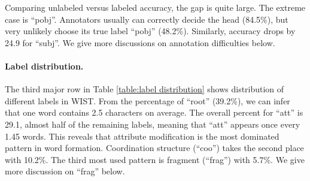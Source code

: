 Comparing unlabeled versus labeled accuracy, the gap is quite large. The extreme case is ``pobj''. Annotators usually can correctly decide the head (84.5\%), but very unlikely choose its true label ``pobj'' (48.2\%). Similarly, accuracy drops by 24.9 for ``subj''. We give more discussions on  annotation difficulties below. 






\paragraph{Label distribution.} 
The third major row in Table \ref{table:label distribution} shows distribution of different labels in WIST. 
From the percentage of ``root'' (39.2\%), we can infer that one word contains 2.5 characters on average. 
The overall percent for ``att'' is 29.1, almost half of the remaining labels, meaning that ``att'' appears once every 1.45  words. This reveals that attribute modification is the most dominated pattern in word formation. 
Coordination structure (``coo'') takes the second place with 10.2\%. 
The third most used pattern is fragment (``frag'') with 5.7\%. 
We give more discussion on ``frag'' below. 

